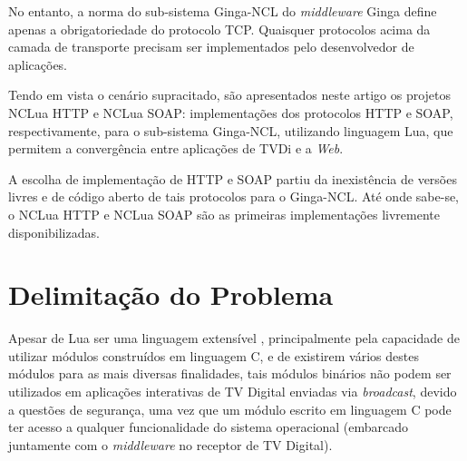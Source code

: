 No entanto, a norma do sub-sistema Ginga-NCL do \textit{middleware} Ginga define 
apenas a obrigatoriedade do protocolo TCP. Quaisquer protocolos acima da camada de transporte
precisam ser implementados pelo desenvolvedor de aplicações. 

Tendo em vista o cenário supracitado, são apresentados neste artigo os projetos NCLua HTTP e NCLua SOAP: implementações dos protocolos HTTP e SOAP, respectivamente, para o sub-sistema Ginga-NCL, utilizando linguagem Lua, que permitem a convergência
entre aplicações de TVDi e a \textit{Web}.

A escolha de implementação de HTTP e SOAP partiu da inexistência de versões livres e de código aberto de tais protocolos para o Ginga-NCL.
Até onde sabe-se, o NCLua HTTP e NCLua SOAP são as primeiras implementações livremente disponibilizadas.

\begin{comment}
O artigo está organizado como segue. 
Na Seção \ref{sec:problema} é apresentado o problema de consumo de \textit{Web Services} em aplicações
de TVDi no Ginga-NCL. 
Na Seção \ref{sec:trabs-rel} são apresentadas as tecnologias e trabalhos relacionados.
Na Seção \ref{sec:modulos-implementados} é apresentada a proposta implementada para prover o consumo de \textit{Web Services} em aplicações de TVDi. 
Na Seção \ref{sec:resultados} são apresentados os resultados alcançados e exemplos de utilização dos módulos desenvolvidos.
Na Seção \ref{sec:conclusao} são tecidas as conclusões. Por fim, na Seção \ref{sec:trabalhos-futuros} são esboçados os trabalhos futuros.
\end{comment}

\section{Delimitação do Problema} \label{sec:problema}

Apesar de Lua ser uma linguagem extensível \cite{ierusalimschy2007evolution}, principalmente pela capacidade de utilizar módulos construídos em linguagem C, e de existirem vários destes módulos para as mais diversas finalidades, tais módulos binários não podem ser utilizados em aplicações interativas de TV Digital enviadas via \textit{broadcast}, devido a questões de segurança, uma vez que um módulo escrito em linguagem C pode ter acesso a qualquer funcionalidade do sistema operacional (embarcado juntamente com o \textit{middleware} no receptor de TV Digital). 

